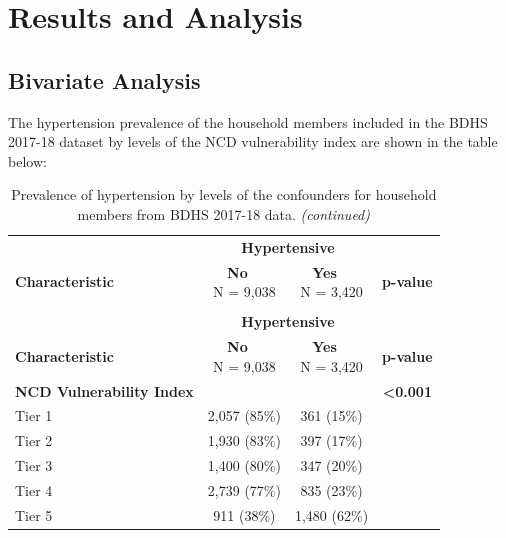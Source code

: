 \documentclass[
  12pt,
  a4paper]{article}
\begin{document}
\section{Results and Analysis}\label{results-and-analysis}

\subsection{Bivariate Analysis}\label{bivariate-analysis}

The hypertension prevalence of the household members included in the BDHS 2017-18 dataset by levels of the NCD vulnerability index are shown in the table below:

\begin{longtable}[t]{lccc}
\caption{\label{tab:bitab}Prevalence of hypertension by levels of the confounders for household members from BDHS 2017-18 data.}\\
\toprule
\multicolumn{1}{c}{ } & \multicolumn{2}{c}{\textbf{Hypertensive}} & \multicolumn{1}{c}{ } \\
\cmidrule(l{3pt}r{3pt}){2-3}
\textbf{Characteristic} & \makecell[c]{\textbf{No}\ \ \\N = 9,038} & \makecell[c]{\textbf{Yes}\ \ \\N = 3,420} & \textbf{p-value}\\
\midrule
\endfirsthead
\caption[]{\label{tab:bitab}Prevalence of hypertension by levels of the confounders for household members from BDHS 2017-18 data. \textit{(continued)}}\\
\toprule
\multicolumn{1}{c}{ } & \multicolumn{2}{c}{\textbf{Hypertensive}} & \multicolumn{1}{c}{ } \\
\cmidrule(l{3pt}r{3pt}){2-3}
\textbf{Characteristic} & \makecell[c]{\textbf{No}\ \ \\N = 9,038} & \makecell[c]{\textbf{Yes}\ \ \\N = 3,420} & \textbf{p-value}\\
\midrule
\endhead

\endfoot
\bottomrule
\endlastfoot
\textbf{NCD Vulnerability Index} &  &  & \textbf{<0.001}\\
\hspace{1em}Tier 1 & 2,057 (85\%) & 361 (15\%) & \\
\hspace{1em}Tier 2 & 1,930 (83\%) & 397 (17\%) & \\
\hspace{1em}Tier 3 & 1,400 (80\%) & 347 (20\%) & \\
\hspace{1em}Tier 4 & 2,739 (77\%) & 835 (23\%) & \\
\hspace{1em}Tier 5 & 911 (38\%) & 1,480 (62\%) & \\*
\end{longtable}
\end{document}
